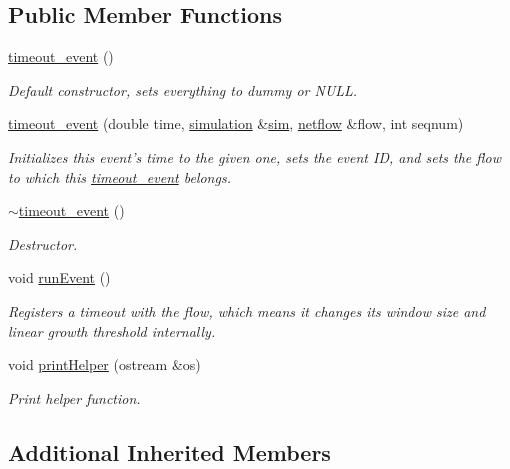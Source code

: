 \subsection*{Public Member Functions}
\begin{DoxyCompactItemize}
\item 
\hyperlink{classtimeout__event_a9388710e5b8e267f3221861ffb1444b4}{timeout\-\_\-event} ()
\begin{DoxyCompactList}\small\item\em Default constructor, sets everything to dummy or N\-U\-L\-L. \end{DoxyCompactList}\item 
\hyperlink{classtimeout__event_afbffa2152738dca0620e10cc60d16cb7}{timeout\-\_\-event} (double time, \hyperlink{classsimulation}{simulation} \&\hyperlink{classevent_a08c6d828bfb6f5539dcd1491e8ac77d2}{sim}, \hyperlink{classnetflow}{netflow} \&flow, int seqnum)
\begin{DoxyCompactList}\small\item\em Initializes this event's time to the given one, sets the event I\-D, and sets the flow to which this \hyperlink{classtimeout__event}{timeout\-\_\-event} belongs. \end{DoxyCompactList}\item 
\hyperlink{classtimeout__event_a8c3be1ba5886d9cb34bc7a257cc2d12c}{$\sim$timeout\-\_\-event} ()
\begin{DoxyCompactList}\small\item\em Destructor. \end{DoxyCompactList}\item 
void \hyperlink{classtimeout__event_abacd620618ef70149548ca014fa7fd57}{run\-Event} ()
\begin{DoxyCompactList}\small\item\em Registers a timeout with the flow, which means it changes its window size and linear growth threshold internally. \end{DoxyCompactList}\item 
void \hyperlink{classtimeout__event_a0c9c73de650b271dccfc6a7d3dedd3ec}{print\-Helper} (ostream \&os)
\begin{DoxyCompactList}\small\item\em Print helper function. \end{DoxyCompactList}\end{DoxyCompactItemize}
\subsection*{Additional Inherited Members}


